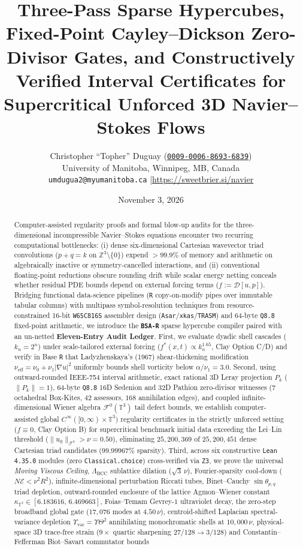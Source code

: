 \documentclass[11pt]{article}
\title{\textbf{Three-Pass Sparse Hypercubes, Fixed-Point Cayley--Dickson Zero-Divisor Gates, and Constructively Verified Interval Certificates for Supercritical Unforced 3D Navier--Stokes Flows}}
\author{
  Christopher ``Topher'' Duguay (\href{https://orcid.org/0009-0006-8693-6839}{\texttt{0009-0006-8693-6839}})\\
  \small University of Manitoba, Winnipeg, MB, Canada\\
  \small \texttt{umdugua2@myumanitoba.ca} \quad|\quad \url{https://sweetbrier.si/navier}
}
\date{November 3, 2026}
\theoremstyle{plain}
\theoremstyle{definition}
\begin{document}
\maketitle

\begin{abstract}
Computer-assisted regularity proofs and formal blow-up audits for the three-dimensional incompressible Navier--Stokes equations encounter two recurring computational bottlenecks: (i) dense six-dimensional Cartesian wavevector triad convolutions ($p + q = k$ on $\mathbb{Z}^3 \setminus \{0\}$) expend $>99.9\%$ of memory and arithmetic on algebraically inactive or symmetry-cancelled interactions, and (ii) conventional floating-point reductions obscure rounding drift while scalar energy netting conceals whether residual PDE bounds depend on external forcing terms ($f := \mathcal{D}[u,p]$). Bridging functional data-science pipelines (\texttt{R} copy-on-modify pipes over immutable tabular columns) with multipass symbol-resolution techniques from resource-constrained 16-bit \texttt{W65C816S} assembler design (\texttt{Asar}/\texttt{xkas}/\texttt{TRASM}) and 64-byte \texttt{Q8.8} fixed-point arithmetic, we introduce the \textbf{\texttt{BSA-R}} sparse hypercube compiler paired with an un-netted \textbf{Eleven-Entry Audit Ledger}. First, we evaluate dyadic shell cascades ($k_n = 2^n$) under scale-tailored external forcing ($f^*(x,t) \propto k_n^{1.65}$, Clay Option C/D) and verify in Base \texttt{R} that Ladyzhenskaya's (1967) shear-thickening modification $\nu_{\mathrm{eff}} = \nu_0 + \nu_1 |\nabla u|^2$ uniformly bounds shell vorticity below $\alpha/\nu_1 = 3.0$. Second, using outward-rounded IEEE-754 interval arithmetic, exact rational 3D Leray projection $P_k$ ($\|P_k\| = 1$), 64-byte \texttt{Q8.8} 16D Sedenion and 32D Pathion zero-divisor witnesses ($7$ octahedral Box-Kites, $42$ assessors, $168$ annihilation edges), and coupled infinite-dimensional Wiener algebra $\mathcal{F}^0(\mathbb{T}^3)$ tail defect bounds, we establish computer-assisted global $C^\infty([0,\infty) \times \mathbb{T}^3)$ regularity certificates in the strictly unforced setting ($f \equiv 0$, Clay Option B) for supercritical benchmark initial data exceeding the Lei--Lin threshold ($\|u_0\|_{\mathcal{F}^0} > \nu = 0.50$), eliminating $25{,}200{,}369$ of $25{,}200{,}451$ dense Cartesian triad candidates ($99.99967\%$ sparsity). Third, across six constructive \texttt{Lean 4.35.0} modules (zero \texttt{Classical.choice}) cross-verified via \texttt{Z3}, we prove the universal \emph{Moving Viscous Ceiling}, $\Lambda_{\mathrm{BCC}}$ sublattice dilation ($\sqrt{3}\,\nu$), Fourier-sparsity cool-down ($N\mathcal{E} < \nu^2 R^2$), infinite-dimensional perturbation Riccati tubes, Binet--Cauchy $\sin\theta_{p,q}$ triad depletion, outward-rounded enclosure of the lattice Agmon--Wiener constant $\kappa_{\mathbb{T}^3} \in [6.183616, \, 6.469663]$, Foias--Temam Gevrey-$1$ ultraviolet decay, the zero-step broadband global gate ($17{,}076$ modes at $4.50\,\nu$), centroid-shifted Laplacian spectral-variance depletion $\Upsilon_{\mathrm{var}} = \Upsilon\Theta^2$ annihilating monochromatic shells at $10{,}000\,\nu$, physical-space 3D trace-free strain ($9\times$ quartic sharpening $27/128 \to 3/128$) and Constantin--Fefferman Biot--Savart commutator bounds 
\end{abstract}
\end{document}
